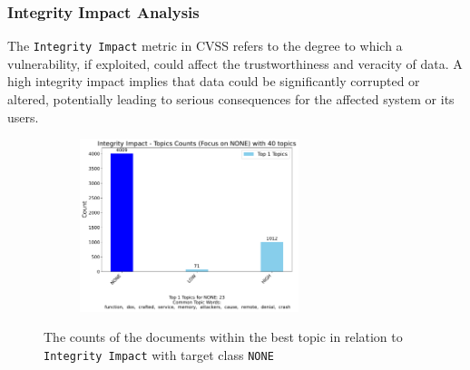 \documentclass[12pt]{article}
\begin{document}
\subsubsection{Integrity Impact Analysis}

The \texttt{Integrity Impact} metric in CVSS refers to the degree to which a vulnerability, if exploited,
could affect the trustworthiness and veracity of data. A high integrity impact implies that data
could be significantly corrupted or altered, potentially leading to serious consequences for the
affected system or its users.

\begin{figure}
	\ContinuedFloat*
	\centering
	\begin{subfigure}{\textwidth}
		\centering
		\includegraphics[width=0.7\textwidth]{figures/integrityImpact/merged_top_k_topics_category_focus_counts_integrityImpact_NONE_k1.pdf}
	\end{subfigure}

	\caption{The counts of the documents within the best topic in relation to \texttt{Integrity
			Impact} with
		target class \texttt{NONE}}

	\label{fig:integrityImpact_60_NONE}
\end{figure}
\end{document}
